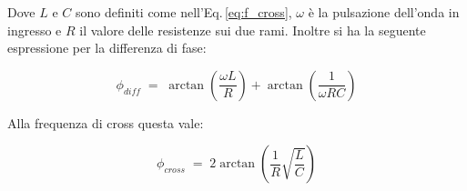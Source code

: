 \documentclass[../Relazione_circuiti]{subfiles}
\begin{document}
Dove $L$ e $C$ sono definiti come nell'Eq.\,\eqref{eq:f_cross}, $\omega$ è la pulsazione dell'onda in ingresso e $R$ il
valore delle resistenze sui due rami.
Inoltre si ha la seguente espressione per la differenza di fase:

\begin{equation}
  \label{eq:p_diff}
  \phi_{diff} \; = \; \arctan(\frac{\omega L}{R}) + \arctan(\frac{1}{\omega RC})
\end{equation}

Alla frequenza di cross questa vale:

\begin{equation}
  \label{eq:p_diff_cross}
  \phi_{cross} \; = \; 2 \arctan(\frac{1}{R} \sqrt{\frac{L}{C}})
\end{equation}
\end{document}
